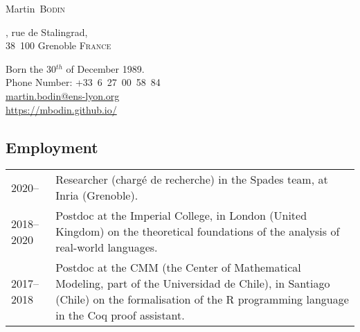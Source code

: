 \documentclass[12pt,a4paper]{article}
\makeatletter
\newcommand{\es}[1]{\foreignlanguage{spanish}{{#1}}}
\newcommand{\es}[1]{\foreignlanguage{spanish}{{#1}}}
\newenvironment{datecvsection}[1]%
               {\subsection*{#1}%
                 \noindent \begin{tabular}{@{}p{\annee}p{\texte}@{}}}
               {\end{tabular}}
\newcommand\familyName{\textsc}
\newcommand\placeName{}
\makeatother
\begin{document}
\pagestyle{empty}


\newlength{\annee}
\settowidth{\annee}{9999—9999} %


\newlength{\texte}
\setlength{\texte}{\textwidth} \addtolength{\texte}{-\annee} 
	\addtolength{\texte}{-2\tabcolsep}

\begin{center} \Huge Martin~\familyName{Bodin} \end{center}

\noindent
\parbox{.5\textwidth}
{
  , rue de Stalingrad, \\
	38~100 Grenoble
  \textsc{France}
}
\parbox{.5\textwidth}
{
\begin{flushright}
  Born the 30\(^{th}\) of December 1989. \\
  \noindent Phone Number: \mbox{+33 6 27 00 58 84} \\
  \url{martin.bodin@ens-lyon.org} \\
  \url{https://mbodin.github.io/}
\end{flushright}
}


\begin{datecvsection}{Employment}

		2020– & Researcher (chargé de recherche) in the \placeName{Spades} team, at \placeName{Inria} (\placeName{Grenoble}). \\

    2018–2020 & Postdoc at the \placeName{Imperial College}, in \placeName{London} (\placeName{United Kingdom}) on the theoretical foundations of the analysis of real-world languages. \\

    2017–2018 & Postdoc at the {CMM} (the Center of Mathematical Modeling, part of the \es{\placeName{Universidad de Chile}}), in \placeName{Santiago} (\placeName{Chile}) on the formalisation of the R programming language in the Coq proof assistant. \\

\end{datecvsection}
\end{document}
